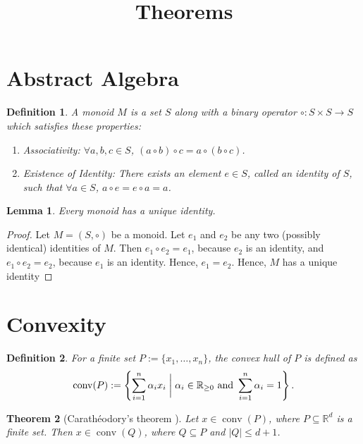 \documentclass[12pt,fleqn]{article}
\title{Theorems}
\author{\empty}
\date{\empty}
\newtheorem{theorem}{Theorem}
\newtheorem{definition}{Definition}
\newtheorem{lemma}[theorem]{Lemma}
\newcommand*{\defeq}{:=}
\DeclareMathOperator{\conv}{conv}
\begin{document}
\maketitle
\setlength{\parindent}{0pt}
\setlength{\parskip}{0.5em}

\section{Abstract Algebra}
\label{sec:abstract-algebra}

\begin{definition}
\label{defn:monoid}
A monoid $M$ is a set $S$ along with a binary operator $\circ: S \times S \to S$ which satisfies these properties:
\begin{enumerate}
\item \label{item:monoid:assoc}\emph{Associativity}:
    $\forall a, b, c \in S$, $(a \circ b) \circ c = a \circ (b \circ c)$.
\item \label{item:monoid:identity}\emph{Existence of Identity}:
    There exists an element $e \in S$, called an \emph{identity} of $S$, such that
    $\forall a \in S$, $a \circ e = e \circ a = a$.
\end{enumerate}
\end{definition}

\begin{lemma}
\label{thm:monoid-unique-identity}
Every monoid has a unique identity.
\end{lemma}
\begin{proof}
Let $M = (S, \circ)$ be a monoid.
Let $e_1$ and $e_2$ be any two (possibly identical) identities of $M$.
Then $e_1 \circ e_2 = e_1$, because $e_2$ is an identity,
and $e_1 \circ e_2 = e_2$, because $e_1$ is an identity.
Hence, $e_1 = e_2$.
Hence, $M$ has a unique identity
\end{proof}

\section{Convexity}
\label{sec:convexity}

\begin{definition}
\label{defn:convex-hull}
For a finite set $P \defeq \{x_1, \ldots, x_n\}$, the \emph{convex hull} of $P$ is defined as
\[ \conv(P) \defeq \left\{\sum_{i=1}^n \alpha_ix_i \biggm| \alpha_i \in \mathbb{R}_{\ge 0}
    \textrm{ and } \sum_{i=1}^n \alpha_i = 1\right\}. \]
\end{definition}

\begin{theorem}[Carath\'eodory's theorem \cite{caratheodory}]
\label{thm:caratheodory}
Let $x \in \conv(P)$, where $P \subseteq \mathbb{R}^d$ is a finite set.
Then $x \in \conv(Q)$, where $Q \subseteq P$ and $|Q| \le d+1$.
\end{theorem}



\end{document}
